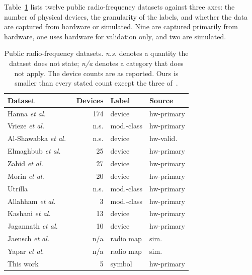 \documentclass{ieeeaccess}
\begin{document}
Table~\ref{tab:related_c} lists twelve public radio-frequency datasets against
three axes: the number of physical devices, the granularity of the labels, and
whether the data are captured from hardware or simulated. Nine are captured
primarily from hardware, one uses hardware for validation only, and two are
simulated.

\begin{table}[!t]
\caption{Public radio-frequency datasets. \emph{n.s.} denotes a quantity the
dataset does not state; \emph{n/a} denotes a category that does not apply. The
device counts are as reported. Ours is smaller than every stated count except
the three of~\cite{saria2019droneRF}.}
\label{tab:related_c}
\centering
\begin{tabular}{lrll}
\toprule
Dataset & Devices & Label & Source \\
\midrule
Hanna \textit{et al.}~\cite{hanna2022WiSig} & 174 & device & hw-primary \\
Vrieze \textit{et al.}~\cite{vrieze2018earnestRF} & n.s. & mod.-class & hw-primary \\
Al-Shawabka \textit{et al.}~\cite{amani2020fingerprint} & n.s. & device & hw-valid. \\
Elmaghbub \textit{et al.}~\cite{bub2021usecase} & 25 & device & hw-primary \\
Zahid \textit{et al.}~\cite{zahid2025comrad} & 27 & device & hw-primary \\
Morin \textit{et al.}~\cite{Morin2019Transmitter} & 20 & device & hw-primary \\
Utrilla~\cite{Utrilla2020MIGOU-MOD} & n.s. & mod.-class & hw-primary \\
Allahham \textit{et al.}~\cite{saria2019droneRF} & 3 & mod.-class & hw-primary \\
Kashani \textit{et al.}~\cite{kashani2024BLE} & 13 & device & hw-primary \\
Jagannath \textit{et al.}~\cite{jagannat2024commercialDevice} & 10 & device & hw-primary \\
Jaensch \textit{et al.}~\cite{jaensch2024radiomapestimation} & n/a & radio map & sim. \\
Yapar \textit{et al.}~\cite{yapar2024datasetpathlosstoaradio} & n/a & radio map & sim. \\
\addlinespace
This work & 5 & symbol & hw-primary \\
\bottomrule
\end{tabular}
\end{table}
\end{document}
